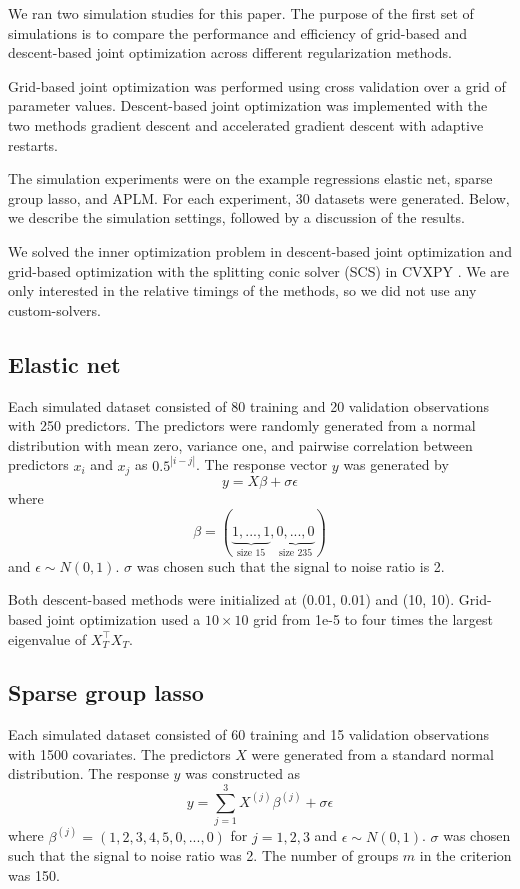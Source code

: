 \documentclass[10pt,letterpaper]{article}
\begin{document}
We ran two simulation studies for this paper. The purpose of the first set of simulations is to compare the performance and efficiency of grid-based and descent-based joint optimization across different regularization methods.

Grid-based joint optimization was performed using cross validation over a grid of parameter values. Descent-based joint optimization was implemented with the two methods gradient descent and accelerated gradient descent with adaptive restarts.

The simulation experiments were on the example regressions elastic net, sparse group lasso, and APLM. For each experiment, 30 datasets were generated. Below, we describe the simulation settings, followed by a discussion of the results.

We solved the inner optimization problem in descent-based joint optimization and grid-based optimization with the splitting conic solver (SCS) in CVXPY \citep{cvxpy}. We are only interested in the relative timings of the methods, so we did not use any custom-solvers.

\subsection{Elastic net}
Each simulated dataset consisted of 80 training and 20 validation observations with 250 predictors. The predictors were randomly generated from a normal distribution with mean zero, variance one, and pairwise correlation between predictors $x_i$ and $x_j$ as $0.5^{|i-j|}$.
The response vector $y$ was generated by
\begin{equation}
y = X\beta + \sigma \epsilon
\end{equation}
where
\begin{equation}
\beta = (\underbrace{1, ..., 1}_\text{size 15}, \underbrace{0, ..., 0}_\text{size 235})
\end{equation}
and $\epsilon \sim N(0, 1)$. $\sigma$ was chosen such that the signal to noise ratio is 2. 

Both descent-based methods were initialized at (0.01, 0.01) and (10, 10). Grid-based joint optimization used a $10 \times 10$ grid from 1e-5 to four times the largest eigenvalue of $X_T^\top X_T$.

\subsection{Sparse group lasso}

Each simulated dataset consisted of 60 training and 15 validation observations with 1500 covariates. The predictors $X$ were generated from a standard normal distribution. The response $y$ was constructed as
\begin{equation}
y = \sum\limits_{j=1}^3 X^{(j)} \beta^{(j)} + \sigma \epsilon
\end{equation}
where $\beta^{(j)} = (1, 2, 3, 4, 5, 0, ..., 0)$ for $j = 1, 2, 3$ and $\epsilon \sim N(0, 1)$. $\sigma$ was chosen such that the signal to noise ratio was 2. The number of groups $m$ in the criterion was 150.
\end{document}
